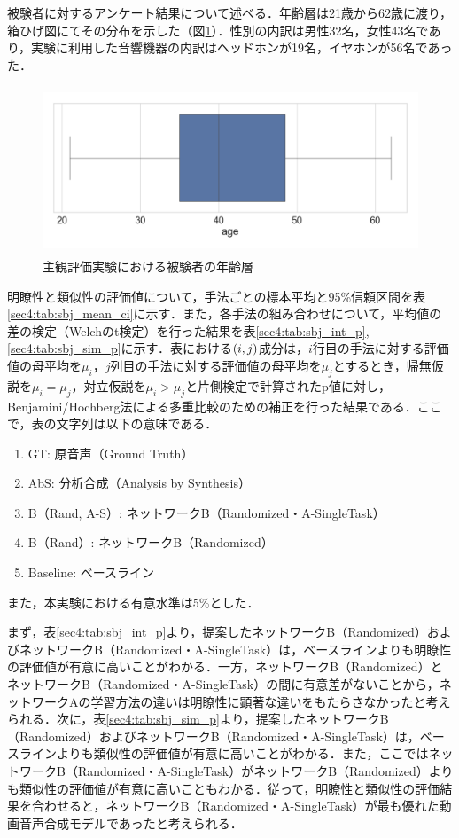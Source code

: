 被験者に対するアンケート結果について述べる．年齢層は21歳から62歳に渡り，箱ひげ図にてその分布を示した（図\ref{sec4:fig:age}）．性別の内訳は男性32名，女性43名であり，実験に利用した音響機器の内訳はヘッドホンが19名，イヤホンが56名であった．
\begin{figure}[b]
    \centering
    \includegraphics[height=50mm]{./figure/sec4/sbj/age.png}
    \caption{主観評価実験における被験者の年齢層}
    \label{sec4:fig:age}
\end{figure}

明瞭性と類似性の評価値について，手法ごとの標本平均と95\%信頼区間を表\ref{sec4:tab:sbj_mean_ci}に示す．また，各手法の組み合わせについて，平均値の差の検定（Welchのt検定）を行った結果を表\ref{sec4:tab:sbj_int_p}, \ref{sec4:tab:sbj_sim_p}に示す．表における$\left(i, j\right)$成分は，$i$行目の手法に対する評価値の母平均を$\mu_{i}$，$j$列目の手法に対する評価値の母平均を$\mu_{j}$とするとき，帰無仮説を$\mu_{i} = \mu_{j}$，対立仮説を$\mu_{i} > \mu_{j}$と片側検定で計算されたp値に対し，Benjamini/Hochberg法による多重比較のための補正を行った結果である．ここで，表の文字列は以下の意味である．
\begin{enumerate}
    \item GT: 原音声（Ground Truth）
    \item AbS: 分析合成（Analysis by Synthesis）
    \item B（Rand, A-S）: ネットワークB（Randomized・A-SingleTask）
    \item B（Rand）: ネットワークB（Randomized）
    \item Baseline: ベースライン
\end{enumerate}
また，本実験における有意水準は5\%とした．

まず，表\ref{sec4:tab:sbj_int_p}より，提案したネットワークB（Randomized）およびネットワークB（Randomized・A-SingleTask）は，ベースラインよりも明瞭性の評価値が有意に高いことがわかる．一方，ネットワークB（Randomized）とネットワークB（Randomized・A-SingleTask）の間に有意差がないことから，ネットワークAの学習方法の違いは明瞭性に顕著な違いをもたらさなかったと考えられる．次に，表\ref{sec4:tab:sbj_sim_p}より，提案したネットワークB（Randomized）およびネットワークB（Randomized・A-SingleTask）は，ベースラインよりも類似性の評価値が有意に高いことがわかる．また，ここではネットワークB（Randomized・A-SingleTask）がネットワークB（Randomized）よりも類似性の評価値が有意に高いこともわかる．従って，明瞭性と類似性の評価結果を合わせると，ネットワークB（Randomized・A-SingleTask）が最も優れた動画音声合成モデルであったと考えられる．


